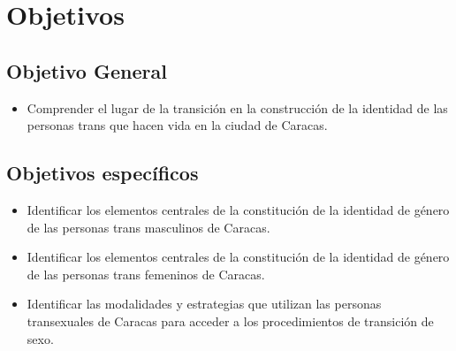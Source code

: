 	

\chapter{Objetivos}


\section{Objetivo General}
	\begin{itemize}
		\item Comprender el lugar de la transición en la construcción de la identidad de
		las personas trans que hacen vida en la ciudad de Caracas.
	\end{itemize}

\section{Objetivos específicos}
	\begin{itemize}
		\item Identificar los elementos centrales de la constitución de la identidad
	de género de las personas trans masculinos de Caracas.
		\item Identificar los elementos centrales de la constitución de la identidad
	de género de las personas trans femeninos de Caracas.
		\item Identificar las modalidades y estrategias que utilizan las personas
	transexuales de Caracas para acceder a los procedimientos de transición de sexo.
	\end{itemize}